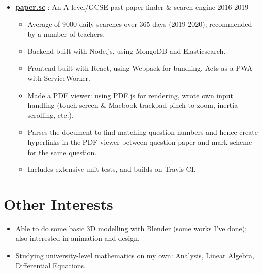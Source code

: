\begin{itemize}
    \item \href{https://paper.sc}{\color{link}\textbf{paper.sc}} : An A-level/GCSE past paper finder \& search engine \dashdiv{} 2016-2019

    \begin{itemize}
      \item Average of \raisebox{0.2\baselineskip}{\texttildelow}9000 daily searches over 365 days (2019-2020); recommended by a number of teachers.
      \item Backend built with Node.js, using MongoDB and Elasticsearch.
      \item Frontend built with React, using Webpack for bundling. Acts as a PWA with ServiceWorker.
      \item Made a PDF viewer: using PDF.js for rendering, wrote own input handling (touch screen \& Macbook trackpad pinch-to-zoom, inertia scrolling, etc.).
      \item Parses the document to find matching question numbers and hence create hyperlinks in the PDF viewer between question paper and mark scheme for the same question.
      \item Includes extensive unit tests, and builds on Travis CI.
    \end{itemize}

  \end{itemize}

  \section{Other Interests}

  \begin{itemize}[itemsep=0.1\parskip]
    \item Able to do some basic 3D modelling with Blender \href{https://maowtm.org/Artworks/}{\color{link}(some works I've done)}; also interested in animation and design.

    \item Studying university-level mathematics on my own: Analysis, Linear Algebra, Differential Equations.
  \end{itemize}



